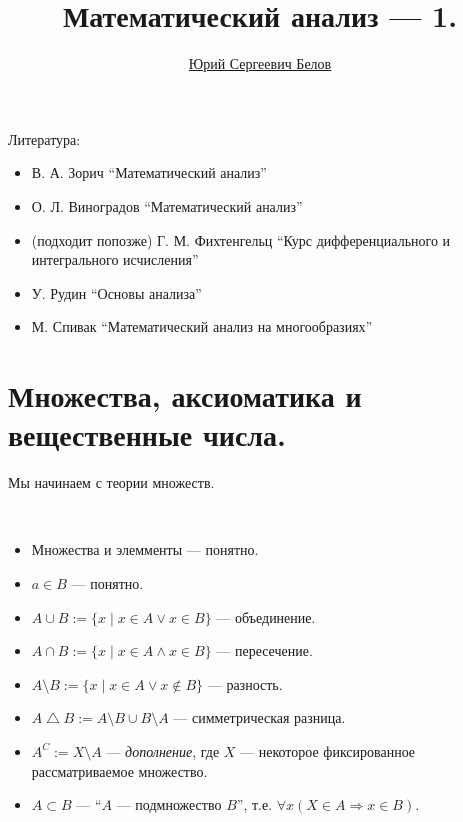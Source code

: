 \documentclass[12pt,a4paper]{article}
\title{Математический анализ --- 1.}
\author{\href{https://vk.com/ybelov}{Юрий Сергеевич Белов}}
\date{}
\begin{document}
    \maketitle

    Литература:
    \begin{itemize}
        \item В. А. Зорич ``Математический анализ''
        \item О. Л. Виноградов ``Математический анализ''
        \item (подходит попозже) Г. М. Фихтенгельц ``Курс дифференциального и интегрального исчисления''
        \item У. Рудин ``Основы анализа''
        \item М. Спивак ``Математический анализ на многообразиях''
    \end{itemize}

    \section{Множества, аксиоматика и вещественные числа.}

    Мы начинаем с теории множеств.

    \begin{definition}\
        \begin{itemize}
            \item Множества и элемменты --- понятно.
            \item $a \in B$ --- понятно.
            \item $A \cup B := \{x \mid x\in A \vee x\in B\}$ --- объединение.
            \item $A \cap B := \{x \mid x\in A \wedge x\in B\}$ --- пересечение.
            \item $A \setminus B := \{x \mid x\in A \vee x\notin B\}$ --- разность.
            \item $A \bigtriangleup B := A \setminus B \cup B \setminus A$ --- симметрическая разница.
            \item $A^C := X\setminus A$ --- \emph{дополнение}, где $X$ --- некоторое фиксированное рассматриваемое множество.
            \item $A \subset B$ --- ``$A$ --- подмножество $B$'', т.е. $\forall x (X\in A \Rightarrow x\in B)$.
        \end{itemize}
    \end{definition}
\end{document}
